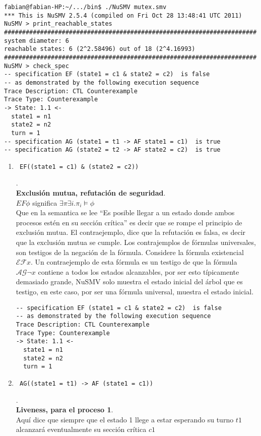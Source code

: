 \documentclass{article}
\begin{document}
\begin{enumerate}
\begin{lstlisting}
fabian@fabian-HP:~/.../bin$ ./NuSMV mutex.smv 
*** This is NuSMV 2.5.4 (compiled on Fri Oct 28 13:48:41 UTC 2011)
NuSMV > print_reachable_states
######################################################################
system diameter: 6
reachable states: 6 (2^2.58496) out of 18 (2^4.16993)
######################################################################
NuSMV > check_spec
-- specification EF (state1 = c1 & state2 = c2)  is false
-- as demonstrated by the following execution sequence
Trace Description: CTL Counterexample 
Trace Type: Counterexample 
-> State: 1.1 <-
  state1 = n1
  state2 = n2
  turn = 1
-- specification AG (state1 = t1 -> AF state1 = c1)  is true
-- specification AG (state2 = t2 -> AF state2 = c2)  is true
\end{lstlisting}

\begin{enumerate}
\item \begin{verbatim} EF((state1 = c1) & (state2 = c2)) \end{verbatim}.\\
{\bf Exclusión mutua, refutación de seguridad}.\\
$EF \phi $ significa $ \exists \pi \exists i. \pi_i\models \phi$\\
Que en la semantica se lee ``Es posible llegar a un estado donde ambos procesos estén en su sección crítica'' es decir que se rompe el principio de exclusión mutua.
El contraejemplo, dice que la refutación es falsa, es decir que la exclusión mutua se cumple.
Los contrajemplos de fórmulas universales, son testigos de la negación de la fórmula. Considere la fórmula existencial $\mathcal{EF}x$. Un contraejemplo de esta fórmula es un testigo de que la fórmula $\mathcal{AG}\neg x$ contiene a todos los estados alcanzables, por ser esto típicamente demasiado grande, NuSMV solo muestra el estado inicial del árbol que es testigo, en este caso, por ser una fórmula universal, muestra el estado inicial.

\begin{lstlisting}
-- specification EF (state1 = c1 & state2 = c2)  is false
-- as demonstrated by the following execution sequence
Trace Description: CTL Counterexample 
Trace Type: Counterexample 
-> State: 1.1 <-
  state1 = n1
  state2 = n2
  turn = 1
\end{lstlisting}

\item \begin{verbatim} AG((state1 = t1) -> AF (state1 = c1)) \end{verbatim}.\\
{\bf Liveness, para el proceso 1}.\\
Aquí dice que siempre que el estado 1 llege a estar esperando su turno $t1$ alcanzará eventualmente su sección crítica $c1$


\end{enumerate}
\end{enumerate}
\end{document}
